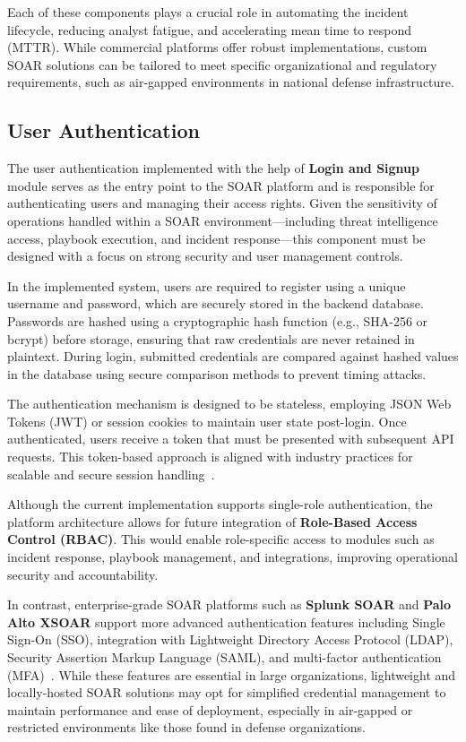 Each of these components plays a crucial role in automating the incident lifecycle, reducing analyst fatigue, and accelerating mean time to respond (MTTR). While commercial platforms offer robust implementations, custom SOAR solutions can be tailored to meet specific organizational and regulatory requirements, such as air-gapped environments in national defense infrastructure.

\subsection{User Authentication}

The user authentication implemented with the help of \textbf{Login and Signup} module serves as the entry point to the SOAR platform and is responsible for authenticating users and managing their access rights. Given the sensitivity of operations handled within a SOAR environment—including threat intelligence access, playbook execution, and incident response—this component must be designed with a focus on strong security and user management controls.

In the implemented system, users are required to register using a unique username and password, which are securely stored in the backend database. Passwords are hashed using a cryptographic hash function (e.g., SHA-256 or bcrypt) before storage, ensuring that raw credentials are never retained in plaintext. During login, submitted credentials are compared against hashed values in the database using secure comparison methods to prevent timing attacks.

The authentication mechanism is designed to be stateless, employing JSON Web Tokens (JWT) or session cookies to maintain user state post-login. Once authenticated, users receive a token that must be presented with subsequent API requests. This token-based approach is aligned with industry practices for scalable and secure session handling~\cite{paloalto, techtarget}.

Although the current implementation supports single-role authentication, the platform architecture allows for future integration of \textbf{Role-Based Access Control (RBAC)}. This would enable role-specific access to modules such as incident response, playbook management, and integrations, improving operational security and accountability.

In contrast, enterprise-grade SOAR platforms such as \textbf{Splunk SOAR} and \textbf{Palo Alto XSOAR} support more advanced authentication features including Single Sign-On (SSO), integration with Lightweight Directory Access Protocol (LDAP), Security Assertion Markup Language (SAML), and multi-factor authentication (MFA)~\cite{splunk, paloalto}. While these features are essential in large organizations, lightweight and locally-hosted SOAR solutions may opt for simplified credential management to maintain performance and ease of deployment, especially in air-gapped or restricted environments like those found in defense organizations.

